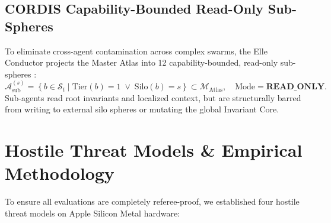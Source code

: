 \documentclass[11pt,letterpaper]{article}
\theoremstyle{definition}
\begin{document}
\subsection{CORDIS Capability-Bounded Read-Only Sub-Spheres}
To eliminate cross-agent contamination across complex swarms, the Elle Conductor projects the Master Atlas into 12 capability-bounded, read-only sub-spheres \cite{barteau2026atlas}:
\begin{equation}
    \mathcal{A}_{\text{sub}}^{(s)} = \left\{ b \in \mathcal{S}_t \mid \text{Tier}(b) = 1 \;\lor\; \text{Silo}(b) = s \right\} \subset \mathcal{M}_{\text{Atlas}}, \quad \text{Mode} = \textbf{READ\_ONLY}.
\end{equation}
Sub-agents read root invariants and localized context, but are structurally barred from writing to external silo spheres or mutating the global Invariant Core.

\section{Hostile Threat Models \& Empirical Methodology}
\label{sec:threat_models}

To ensure all evaluations are completely referee-proof, we established four hostile threat models on Apple Silicon Metal hardware:
\end{document}
